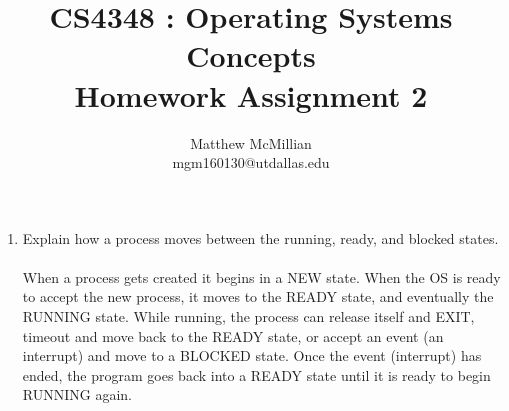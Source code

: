 \documentclass[12pt]{article}
\begin{document}
\title{CS4348 : Operating Systems Concepts\\Homework Assignment 2}
\author{Matthew McMillian\\mgm160130@utdallas.edu}
\maketitle

\begin{enumerate}
	
	\item Explain how a process moves between the running, ready, and blocked states. \\ \\
	When a process gets created it begins in a NEW state. When the OS is ready to accept the new process, it moves to the READY state, and eventually the RUNNING state. While running, the process can release itself and EXIT, timeout and move back to the READY state, or accept an event (an interrupt) and move to a BLOCKED state. Once the event (interrupt) has ended, the program goes back into a READY state until it is ready to begin RUNNING again. \\
	

\end{enumerate}
\end{document}
